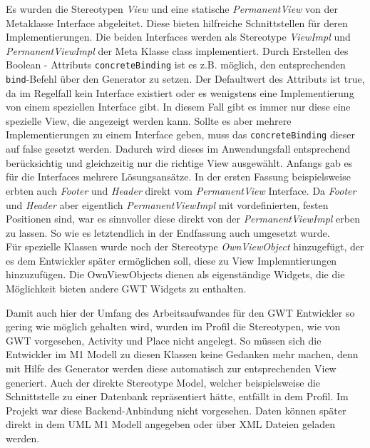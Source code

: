 Es wurden die Stereotypen  \textit{View} und eine statische  \textit{PermanentView} von der Metaklasse Interface abgeleitet. Diese bieten hilfreiche Schnittstellen für deren Implementierungen. Die beiden Interfaces werden als Stereotype  \textit{ViewImpl} und  \textit{PermanentViewImpl} der Meta Klasse class implementiert. Durch Erstellen des Boolean - Attributs \texttt{concreteBinding} ist es z.B. möglich, den entsprechenden \texttt{bind}-Befehl über den Generator zu setzen. Der Defaultwert des Attributs ist true, da im Regelfall kein Interface existiert oder es wenigstens eine Implementierung von einem speziellen Interface gibt. In diesem Fall gibt es immer nur diese eine spezielle View, die angezeigt werden kann. Sollte es aber mehrere Implementierungen zu einem Interface geben, muss das  \texttt{concreteBinding}  dieser auf false gesetzt werden. Dadurch wird dieses im Anwendungsfall entsprechend berücksichtig und gleichzeitig nur die richtige View ausgewählt.
Anfangs gab es für die Interfaces mehrere Lösungsansätze. In der ersten Fassung beispielsweise erbten auch  \textit{Footer}  und  \textit{Header}  direkt vom \textit{PermanentView} Interface. Da  \textit{Footer} und  \textit{Header} aber eigentlich \textit{PermanentViewImpl} mit vordefinierten, festen Positionen sind, war es sinnvoller diese direkt von der \textit{PermanentViewImpl} erben zu lassen. So wie es letztendlich in der Endfassung auch umgesetzt wurde.  \\

Für spezielle Klassen wurde noch der Stereotype \textit{OwnViewObject} hinzugefügt, der es dem Entwickler später ermöglichen soll, diese zu View Implemntierungen hinzuzufügen. Die OwnViewObjects dienen als eigenständige Widgets, die die Möglichkeit bieten andere GWT Widgets zu enthalten.

Damit auch hier der Umfang des Arbeitsaufwandes für den GWT Entwickler so gering wie möglich gehalten wird, wurden im Profil die Stereotypen, wie von GWT vorgesehen, Activity und Place nicht angelegt. So müssen sich die Entwickler im M1 Modell zu diesen Klassen keine Gedanken mehr machen, denn mit Hilfe des Generator werden diese automatisch zur entsprechenden View generiert. 
Auch der direkte Stereotype Model, welcher beispielsweise die Schnittstelle zu einer Datenbank repräsentiert hätte, entfällt in dem Profil. Im Projekt war diese Backend-Anbindung nicht vorgesehen. Daten können später direkt in dem UML M1 Modell angegeben oder über XML Dateien geladen werden.